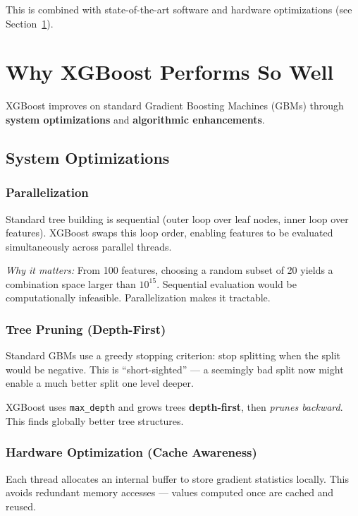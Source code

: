 \documentclass[11pt]{article}
\begin{document}
This is combined with state-of-the-art software and hardware optimizations (see
Section~\ref{sec:why_xgb_performs}).

\newpage
\section{Why XGBoost Performs So Well}
\label{sec:why_xgb_performs}

XGBoost improves on standard Gradient Boosting Machines (GBMs) through
\textbf{system optimizations} and \textbf{algorithmic enhancements}.

\subsection{System Optimizations}

\subsubsection{Parallelization}
Standard tree building is sequential (outer loop over leaf nodes, inner loop over
features). XGBoost swaps this loop order, enabling features to be evaluated
simultaneously across parallel threads.

\textit{Why it matters:} From 100 features, choosing a random subset of 20 yields
a combination space larger than $10^{15}$. Sequential evaluation would be
computationally infeasible. Parallelization makes it tractable.

\subsubsection{Tree Pruning (Depth-First)}
Standard GBMs use a greedy stopping criterion: stop splitting when the split would
be negative. This is ``short-sighted'' --- a seemingly bad split now might enable a
much better split one level deeper.

XGBoost uses \texttt{max\_depth} and grows trees \textbf{depth-first}, then
\emph{prunes backward}. This finds globally better tree structures.

\subsubsection{Hardware Optimization (Cache Awareness)}
Each thread allocates an internal buffer to store gradient statistics locally. This
avoids redundant memory accesses --- values computed once are cached and reused.
\end{document}
